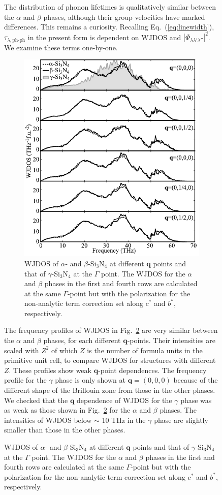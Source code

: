 \documentclass[twocolumn,amsmath,amssymb,a4paper,prb,superscriptaddress,floatfix]{revtex4-1}
\begin{document}
\begin{figure}[h]
The distribution of phonon lifetimes is qualitatively similar between the $\alpha$ and
$\beta$ phases, although their group velocities have marked differences. This
remains a curiosity. 
Recalling Eq.~(\ref{eq:linewidth}), $\tau_{\lambda,\text{ph-ph}}$ in the
present form is dependent on WJDOS
and $|\Phi_{\lambda\lambda'\lambda''}|^2$. We examine these terms one-by-one.

\begin{figure}[ht]
 \centering
  \includegraphics[width=0.9\linewidth]{figure_wjdoss_gray.pdf} \caption{
	  WJDOS of $\alpha$- and $\beta$-Si$_3$N$_4$ at different $\mathbf
	  q$ points and that of $\gamma$-Si$_3$N$_4$ at the $\Gamma$ point. 
  The WJDOS for the $\alpha$ and $\beta$ phases in the  first and fourth rows
  are calculated at the same $\Gamma$-point but 
  with the polarization for the non-analytic term correction set along $c^*$ and
  $b^*$, respectively. \label{fig:Fig6_338} }
 \centering
\end{figure}

The frequency profiles of WJDOS in Fig.~\ref{fig:Fig6_338} are very similar between the $\alpha$ and
$\beta$ phases, for each different $\mathbf{q}$-points.  Their intensities are
scaled with $Z^2$ of which $Z$ is the number of formula units in the primitive
unit cell, to compare WJDOS for structures with different $Z$.  These profiles
show weak $\mathbf{q}$-point dependences.  The frequency profile for the
$\gamma$ phase is only shown at $\mathbf{q}=(0,0,0)$ because of the different
shape of the Brillouin zone from those in the other phases.  We checked that
the $\mathbf{q}$ dependence of WJDOS for the $\gamma$ phase was as weak as
those shown in Fig.~\ref{fig:Fig6_338} for the $\alpha$ and $\beta$ phases.
The intensities of WJDOS below $\sim$ 10 THz in the $\gamma$ phase are slightly smaller than those in
the other phases. 



\end{figure}
\end{document}
